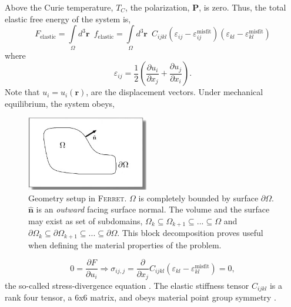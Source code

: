 \documentclass[16pt]{article} %
\begin{document}
Above the Curie temperature, $T_C$, the polarization, $\textbf{P}$, is zero. 
%
Thus, the total elastic free energy of the system is, 
%
\begin{equation}\tag{1}
F_\mathrm{elastic} = \int\limits_\Omega d^3 \textbf{r} \,\,\, f_\mathrm{elastic} = \int\limits_\Omega d^3 \textbf{r} \,\,\, C_{ijkl} \left(\varepsilon_{ij} - \varepsilon_{ij}^\mathrm{misfit} \right) \left(\varepsilon_{kl} - \varepsilon_{kl}^\mathrm{misfit} \right) 
\end{equation}
%
where 
%
\begin{equation}\tag{2}
\varepsilon_{ij} = \frac{1}{2} \left(\frac{\partial u_i}{\partial x_j} + \frac{\partial u_j}{\partial x_i} \right).
\end{equation}
%
Note that $u_i =  u_i (\textbf{r})$, are the displacement vectors.
%
Under mechanical equilibrium, the system obeys,
%
\begin{figure}
  \begin{center}
\vspace{-12pt}
    \includegraphics[width=0.475\textwidth]{geometry.jpg}
  \end{center}
  \caption{Geometry setup in \textsc{Ferret}.
%
$\Omega$ is completely bounded by surface $\partial \Omega$. $\hat{\textbf{n}}$ is an \emph{outward} facing surface normal.
%
The volume and the surface may exist as set of subdomains, $\Omega_k \subseteq \Omega_{k+1} \subseteq ... \subseteq \Omega$ and $\partial \Omega_k \subseteq \partial \Omega_{k+1} \subseteq ... \subseteq \partial \Omega$.
%
This block decomposition proves useful when defining the material properties of the problem.} %
\end{figure}
%
%
\begin{equation}\tag{3}
0 = \frac{\partial F}{\partial u_i} \Rightarrow \sigma_{ij,j} = \frac{\partial}{\partial x_j} C_{ijkl} \left(\varepsilon_{kl} - \varepsilon_{kl}^\mathrm{misfit} \right) = 0,
\end{equation}
%
the so-called stress-divergence equation \cite{Morton1975, BowerBook}.
%
The elastic stiffness tensor $C_{ijkl}$ is a rank four tensor, a 6x6 matrix, and obeys material point group symmetry \cite{NyeBook}.
%
\end{document}
